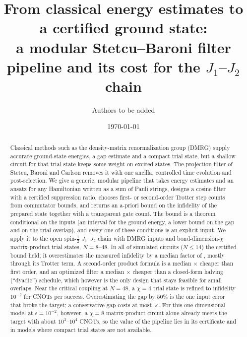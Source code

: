 \documentclass[aps,pra,twocolumn,superscriptaddress,nofootinbib]{revtex4-2}
\begin{document}
\title{From classical energy estimates to a certified ground state:\\
a modular Stetcu--Baroni filter pipeline and its cost for the $J_1$--$J_2$ chain}

\author{Authors to be added}
\date{\today}

\begin{abstract}
Classical methods such as the density-matrix renormalization group (DMRG) supply accurate
ground-state energies, a gap estimate and a compact trial state, but a shallow circuit for that trial
state keeps some weight on excited states. The projection filter of Stetcu, Baroni and Carlson removes
it with one ancilla, controlled time evolution and post-selection. We give a generic, modular pipeline
that takes energy estimates and an ansatz for any Hamiltonian written as a sum of Pauli strings, designs
a cosine filter with a certified suppression ratio, chooses first- or second-order Trotter step counts
from commutator bounds, and returns an a-priori bound on the infidelity of the prepared state together
with a transparent gate count. The bound is a theorem conditional on the inputs (an interval for the
ground energy, a lower bound on the gap and on the trial overlap), and every one of these conditions is
an explicit input. We apply it to the open spin-$\tfrac12$ $J_1$--$J_2$ chain with DMRG inputs and
bond-dimension-$\chi$ matrix-product trial states, $N=8$--$48$. In all \nSimOK{} of \nSim{} simulated
circuits ($N\le14$) the certified bound held; it overestimates the measured infidelity by a median
factor of \boundRatioMed, mostly through its Trotter term. A second-order product formula is a median
\gainOrderMed$\times$ cheaper than first order, and an optimized filter a median \gainOptMed$\times$
cheaper than a closed-form halving (``dyadic'') schedule, which however is the only design that stays
feasible for small overlaps. Near the critical coupling at $N=48$, a $\chi=4$ trial state is refined to
infidelity $10^{-2}$ for \cnotFortyEightChiFour{} CNOTs per success. Overestimating the gap by
$50\%$ is the one input error that broke the target; a conservative gap costs at most
\gapMarginCost$\times$. For this one-dimensional model at $\epsilon=10^{-2}$, however, a $\chi=8$
matrix-product circuit alone already meets the target with about $10^{3}$--$10^{4}$ CNOTs, so the value of
the pipeline lies in its certificate and in models where compact trial states are not available.
\end{abstract}

\maketitle
\end{document}
